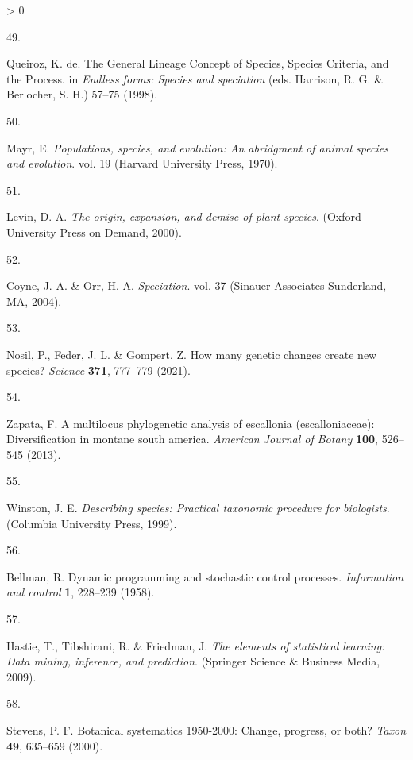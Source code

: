 \documentclass[
  11pt,
]{article}
\newlength{\cslhangindent}
\newlength{\csllabelwidth}
\newenvironment{CSLReferences}[2] %
 {%
  \setlength{\parindent}{0pt}
  \ifodd #1 \everypar{\setlength{\hangindent}{\cslhangindent}}\ignorespaces\fi
  \ifnum #2 > 0
  \setlength{\parskip}{#2\baselineskip}
  \fi
 }%
 {}
\newcommand{\CSLLeftMargin}[1]{\parbox[t]{\csllabelwidth}{#1}}
\newcommand{\CSLRightInline}[1]{\parbox[t]{\linewidth - \csllabelwidth}{#1}\break}
\begin{document}
\begin{CSLReferences}{0}{0}
\leavevmode\hypertarget{ref-de1998general}{}%
\CSLLeftMargin{49. }
\CSLRightInline{Queiroz, K. de. {The General Lineage Concept of Species, Species Criteria, and the Process}. in \emph{Endless forms: Species and speciation} (eds. Harrison, R. G. \& Berlocher, S. H.) 57--75 (1998).}

\leavevmode\hypertarget{ref-mayr1970populations}{}%
\CSLLeftMargin{50. }
\CSLRightInline{Mayr, E. \emph{Populations, species, and evolution: An abridgment of animal species and evolution}. vol. 19 (Harvard University Press, 1970).}

\leavevmode\hypertarget{ref-levin2000origin}{}%
\CSLLeftMargin{51. }
\CSLRightInline{Levin, D. A. \emph{The origin, expansion, and demise of plant species}. (Oxford University Press on Demand, 2000).}

\leavevmode\hypertarget{ref-coyne2004speciation}{}%
\CSLLeftMargin{52. }
\CSLRightInline{Coyne, J. A. \& Orr, H. A. \emph{Speciation}. vol. 37 (Sinauer Associates Sunderland, MA, 2004).}

\leavevmode\hypertarget{ref-nosil2021many}{}%
\CSLLeftMargin{53. }
\CSLRightInline{Nosil, P., Feder, J. L. \& Gompert, Z. How many genetic changes create new species? \emph{Science} \textbf{371}, 777--779 (2021).}

\leavevmode\hypertarget{ref-zapata2013multilocus}{}%
\CSLLeftMargin{54. }
\CSLRightInline{Zapata, F. A multilocus phylogenetic analysis of escallonia (escalloniaceae): Diversification in montane south america. \emph{American Journal of Botany} \textbf{100}, 526--545 (2013).}

\leavevmode\hypertarget{ref-winston1999describing}{}%
\CSLLeftMargin{55. }
\CSLRightInline{Winston, J. E. \emph{Describing species: Practical taxonomic procedure for biologists}. (Columbia University Press, 1999).}

\leavevmode\hypertarget{ref-bellman1958dynamic}{}%
\CSLLeftMargin{56. }
\CSLRightInline{Bellman, R. Dynamic programming and stochastic control processes. \emph{Information and control} \textbf{1}, 228--239 (1958).}

\leavevmode\hypertarget{ref-hastie2009elements}{}%
\CSLLeftMargin{57. }
\CSLRightInline{Hastie, T., Tibshirani, R. \& Friedman, J. \emph{The elements of statistical learning: Data mining, inference, and prediction}. (Springer Science \& Business Media, 2009).}

\leavevmode\hypertarget{ref-stevens2000botanical}{}%
\CSLLeftMargin{58. }
\CSLRightInline{Stevens, P. F. Botanical systematics 1950-2000: Change, progress, or both? \emph{Taxon} \textbf{49}, 635--659 (2000).}


\end{CSLReferences}
\end{document}
